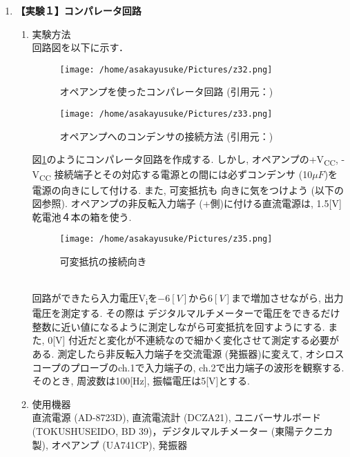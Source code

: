 \documentclass[uplatex,a4paper,11pt,dvipdfmxs]{jsarticle}
\begin{document}
\begin{enumerate}
    \item {\bf \large 【実験１】コンパレータ回路}\\
    \begin{enumerate}
        \item[3.1] 実験方法\\
        回路図を以下に示す．
        \begin{figure}[H]
        \centering
        \texttt{[image: /home/asakayusuke/Pictures/z32.png]}
        \caption{オペアンプを使ったコンパレータ回路 (引用元：\cite{Okumura})}
        \label{figure:i}
        \end{figure}
        \begin{figure}[H]
            \centering
            \texttt{[image: /home/asakayusuke/Pictures/z33.png]}
            \caption{オペアンプへのコンデンサの接続方法 (引用元：\cite{Okumura})}
            \label{figure:cc}
            \end{figure}
        図\ref{figure:i}のようにコンパレータ回路を作成する. しかし, オペアンプの+V\textsubscript{CC}, -V\textsubscript{CC}
        接続端子とその対応する電源との間には必ずコンデンサ (10\(\mu F\))を電源の向きにして付ける. また, 可変抵抗も
        向きに気をつけよう (以下の図参照). オペアンプの非反転入力端子 (+側)に付ける直流電源は, 1.5[V]乾電池４本の箱を使う. 
        \\
        \begin{figure}[H]
        \centering
        \texttt{[image: /home/asakayusuke/Pictures/z35.png]}
        \caption{可変抵抗の接続向き}
        \label{figure:teiko}
        \end{figure}
        \\
        回路ができたら入力電圧V\textsubscript{i}を\(-6[V]から6[V]\)まで増加させながら, 出力電圧を測定する. その際は
        デジタルマルチメーターで電圧をできるだけ整数に近い値になるように測定しながら可変抵抗を回すようにする. また, 0[V]
        付近だと変化が不連続なので細かく変化させて測定する必要がある. 測定したら非反転入力端子を交流電源 (発振器)に変えて, 
        オシロスコープのプローブのch.1で入力端子の, ch.2で出力端子の波形を観察する. そのとき, 周波数は100[Hz], 振幅電圧は5[V]とする. \\

        \item[3.2] 使用機器\\
        直流電源 (AD-8723D), 直流電流計 (DCZA21), ユニバーサルボード (TOKUSHUSEIDO, BD 39)，デジタルマルチメーター (東陽テクニカ製), 
        オペアンプ (UA741CP), 発振器\\


\end{enumerate}
\end{enumerate}
\end{document}
